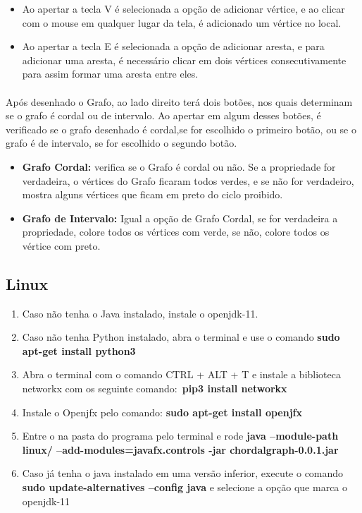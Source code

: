 \documentclass[a4paper, 11pt]{article}
\begin{document}
				\begin{itemize}
					\item Ao apertar a tecla V é selecionada a opção de adicionar vértice, e ao clicar com o mouse em qualquer lugar da tela, é adicionado um vértice no local.
					
					\item Ao apertar a tecla E é selecionada a opção de adicionar aresta, e para adicionar uma aresta, é necessário clicar em dois vértices consecutivamente para assim formar uma aresta entre eles.
					
				\end{itemize}
			
				\paragraph{}Após desenhado o Grafo, ao lado direito terá dois botões, nos quais determinam se o grafo é cordal ou de intervalo. Ao apertar em algum desses botões, é verificado se o grafo desenhado é cordal,se for escolhido o primeiro botão, ou se o grafo é de intervalo, se for escolhido o segundo botão.
				
				\begin{itemize}
					\item \textbf{Grafo Cordal:} verifica se o Grafo é cordal ou não. Se a propriedade for verdadeira, o vértices do Grafo ficaram todos verdes, e se não for verdadeiro, mostra alguns vértices que ficam em preto do ciclo proibido.
					
					\item \textbf{Grafo de Intervalo:} Igual a opção de Grafo Cordal, se for verdadeira a propriedade, colore todos os vértices com verde, se não, colore todos os vértice com preto.
				\end{itemize}
				
				
			\subsection{Linux}
				\begin{enumerate}
					\item Caso não tenha o Java instalado, instale o openjdk-11.
					\item Caso não tenha Python instalado, abra o terminal e use o comando \textbf{sudo apt-get install python3}
					
					\item Abra o terminal com o comando CTRL + ALT + T e instale a biblioteca networkx com os seguinte comando:\ \textbf{pip3 install networkx}
					\item Instale o Openjfx pelo comando:
					\textbf{sudo apt-get install openjfx}
					\item Entre o na pasta do programa pelo terminal e rode \textbf{java --module-path linux/ --add-modules=javafx.controls -jar chordalgraph-0.0.1.jar}
					
					\item Caso já tenha o java instalado em uma versão inferior, execute o comando \textbf{sudo update-alternatives --config java} e selecione a opção que marca o openjdk-11
					
				\end{enumerate}
\end{document}
